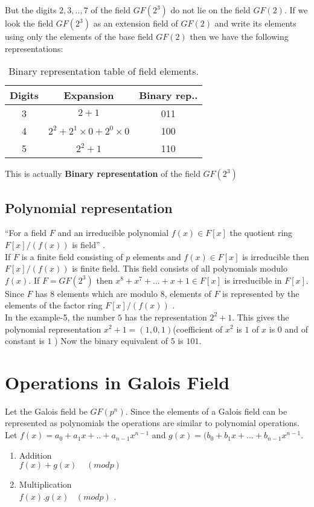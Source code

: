 But the digits \(2,3,..,7\) of the field \(GF(2^3)\) do not lie on the field \(GF(2)\). If we look the field \(GF(2^3)\) as an extension field of \(GF(2)\) and write its elements using only the elements of the base field \(GF(2)\) then we have the following representations:
\vspace{3mm}

\begin{table}[h!]
  \centering
\begin{tabular}{|c|c|c|}
    \hline
    Digits & Expansion & Binary rep..\\
    \hline
    3 & \(2+1\) & 011 \\
    4 & \(2^2+2^1 \times 0 +2^0 \times 0\) & 100 \\
    5 & \(2^2+1\) & 110 \\
    \hline
\end{tabular}
\caption{\small Binary representation table of field elements.}
\end{table}
\vspace{3mm}

This is actually \textbf{Binary representation} of the field \(GF(2^3)\)



\subsection{Polynomial representation}
``For a field \(F\) and an irreducible polynomial \(f(x) \in F[x]\) the quotient ring \(F[x]/(f(x))\) is field'' \cite{galois}.\\
If \(F\) is a finite field consisting of \(p\) elements and \(f(x) \in F[x]\) is irreducible then \(F[x]/(f(x))\) is finite field. This field consists of all polynomials modulo \(f(x)\). If \(F=GF(2^3)\) then \(x^8+x^7+...+x+1 \in F[x]\) is irreducible in \(F[x]\). Since \(F\) has \(8\) elements which are modulo \(8\), elements of \(F\) is represented by the elements of the factor ring \(F[x]/(f(x))\) \cite{aes}. \\


In the example-5, the number \(5\) has the representation \(2^2+1\). This gives the polynomial representation \(x^2+1=(1,0,1)\)(coefficient of \(x^2\) is \(1\) of \(x\) is \(0\) and of constant is \(1\) ) Now the binary equivalent of \(5\) is \(101\).

\section{Operations in Galois Field}
Let the Galois field be \(GF(p^n)\). Since the elements of a Galois field can be represented as polynomials the operations are similar to polynomial operations. Let \(f(x)=a_0+a_1x+..+a_{n-1}x^{n-1}\) and \(g(x)=(b_0+b_1x+...+b_{n-1}x^{n-1}\).
\begin{enumerate}
  \item Addition \\
  \(f(x)+g(x)\;\;\;\; (modp)\)
  \item Multiplication \\
  \(f(x).g(x)\;\;\; (modp)\) \cite{aes}.
\end{enumerate}
